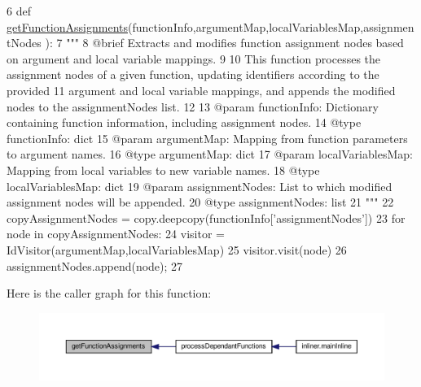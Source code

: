 \begin{DoxyCode}
6 \textcolor{keyword}{def }\hyperlink{namespaceutils_a04fa4bbfa41595f584571fb61a6047c5}{getFunctionAssignments}(functionInfo,argumentMap,localVariablesMap,assignmentNodes
      ):
7     \textcolor{stringliteral}{"""
}
8 \textcolor{stringliteral}{    @brief Extracts and modifies function assignment nodes based on argument and local variable mappings.
}
9 \textcolor{stringliteral}{
}
10 \textcolor{stringliteral}{    This function processes the assignment nodes of a given function, updating identifiers according to the
       provided 
}
11 \textcolor{stringliteral}{    argument and local variable mappings, and appends the modified nodes to the assignmentNodes list.
}
12 \textcolor{stringliteral}{
}
13 \textcolor{stringliteral}{    @param functionInfo: Dictionary containing function information, including assignment nodes.
}
14 \textcolor{stringliteral}{    @type functionInfo: dict
}
15 \textcolor{stringliteral}{    @param argumentMap: Mapping from function parameters to argument names.
}
16 \textcolor{stringliteral}{    @type argumentMap: dict
}
17 \textcolor{stringliteral}{    @param localVariablesMap: Mapping from local variables to new variable names.
}
18 \textcolor{stringliteral}{    @type localVariablesMap: dict
}
19 \textcolor{stringliteral}{    @param assignmentNodes: List to which modified assignment nodes will be appended.
}
20 \textcolor{stringliteral}{    @type assignmentNodes: list
}
21 \textcolor{stringliteral}{    """}
22     copyAssignmentNodes = copy.deepcopy(functionInfo[\textcolor{stringliteral}{'assignmentNodes'}])
23     \textcolor{keywordflow}{for} node \textcolor{keywordflow}{in} copyAssignmentNodes:
24         visitor = IdVisitor(argumentMap,localVariablesMap)
25         visitor.visit(node)
26         assignmentNodes.append(node);
27 
\end{DoxyCode}
Here is the caller graph for this function\+:\nopagebreak
\begin{figure}[H]
\begin{center}
\leavevmode
\includegraphics[width=350pt]{namespaceutils_a04fa4bbfa41595f584571fb61a6047c5_icgraph}
\end{center}
\end{figure}
\mbox{\label{namespaceutils_a63a441384eb62bbf51329ab7e1b212a6}} 

